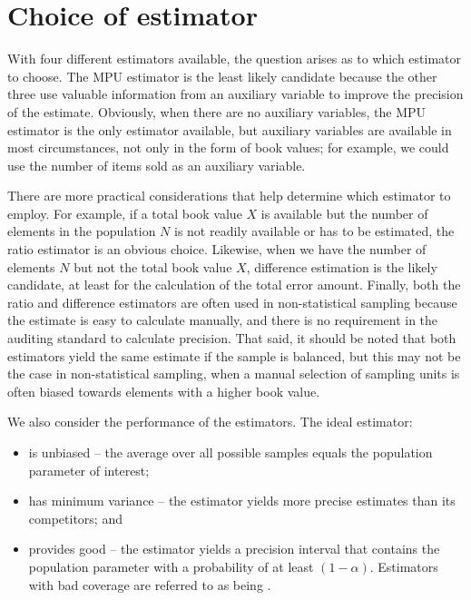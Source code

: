 
\section{Choice of estimator} %
\label{sec:choice_of_estimator}

With four different estimators available, the question arises as to which estimator to choose. The MPU estimator is the least likely candidate because the other three use valuable information from an auxiliary variable to improve the precision of the estimate. Obviously, when there are no auxiliary variables, the MPU estimator is the only estimator available, but auxiliary variables are available in most circumstances, not only in the form of book values; for example, we could use the number of items sold as an auxiliary variable.

There are more practical considerations that help determine which estimator to employ. For example, if a total book value $X$ is available but the number of elements in the population $N$ is not readily available or has to be estimated, the ratio estimator is an obvious choice. Likewise, when we have the number of elements $N$ but not the total book value $X$, difference estimation is the likely candidate, at least for the calculation of the total error amount. Finally, both the ratio and difference estimators are often used in non-statistical sampling because the estimate is easy to calculate manually, and there is no requirement in the auditing standard to calculate precision. That said, it should be noted that both estimators yield the same estimate if the sample is balanced, but this may not be the case in non-statistical sampling, when a manual selection of sampling units is often biased towards elements with a higher book value.

We also consider the performance of the estimators. The ideal estimator: 

\begin{itemize}
\item is unbiased -- the average over all possible samples equals the population parameter of interest;
\item has minimum variance -- the estimator yields more precise estimates than its competitors; and
\item provides good  -- the estimator yields a precision interval that contains the population parameter with a probability of at least $(1 - \alpha)$. Estimators with bad coverage are referred to as being .
\end{itemize}

